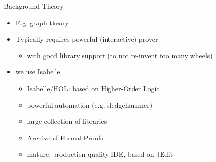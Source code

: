 \documentclass[fleqn]{beamer}
\begin{document}
\begin{frame}{Background Theory}
  \begin{itemize}
   \item<1-> E.g. graph theory
   \item<2-> Typically requires powerful (interactive) prover
    \begin{itemize}
     \item with good library support (to not re-invent too many wheels)

    \end{itemize}
   \item<3-> we use Isabelle
      \begin{itemize}
       \item<4-> Isabelle/HOL: based on Higher-Order Logic
       \item<5-> powerful automation (e.g. sledgehammer)
       \item<6-> large collection of libraries
       \item<7-> Archive of Formal Proofs
       \item<8-> mature, production quality IDE, based on JEdit

      \end{itemize}
  \end{itemize}
  \vfill

  \hfill
  \hfill
  \hfill
  \hfill
  \hfill
  \hfill{}


\end{frame}
\end{document}
